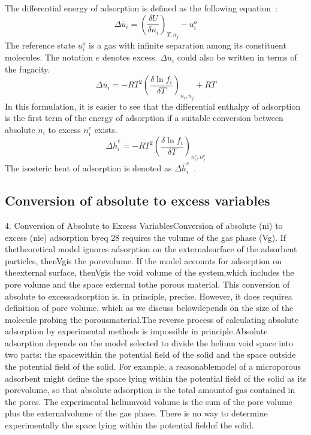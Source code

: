 \documentclass[letterpaper,twocolumn,amsmath,amssymb,jcp,aps,10pt]{revtex4-1}
\begin{document}
The differential energy of adsorption is defined as the following equation~\cite{myers2002adsorption}:
\begin{equation}
    \Delta \bar u_i = \left( \frac{\delta U}{\delta n_i} \right)_{T,n_j} - u_i^o
\end{equation}
The reference state $u_i^o$ is a gas with infinite separation among its constituent molecules. The notation $e$ denotes excess. $\Delta \bar u_i$ could
also be written in terms of the fugacity.
\begin{equation}
    \Delta \bar u_i = -R T^2\left( \frac{\delta \ln f_i}{\delta T} \right)_{n_i,n_j} + RT
\end{equation}
In this formulation, it is easier to see that the differential enthalpy of adsorption is the first term of the energy of adsorption if a suitable conversion between absolute $n_i$ to excess $n_i^e$ exists.
\begin{equation}
    \Delta \bar h_i^e = -R T^2\left( \frac{\delta \ln f_i}{\delta T} \right)_{n_i^e,n_j^e}
\end{equation}
The isosteric heat of adsorption is denoted as $\Delta \bar h_i^e$~\cite{myers2002adsorption}.

\subsection{Conversion of absolute to excess variables}
4. Conversion of Absolute to Excess VariablesConversion of absolute (ni) to excess (nie) adsorption byeq 28 requires the volume of the gas phase (Vg). If thetheoretical  model  ignores  adsorption  on  the  externalsurface of the adsorbent particles, thenVgis the porevolume.  If  the  model  accounts  for  adsorption  on  theexternal surface, thenVgis the void volume of the system,which includes the pore volume and the space external tothe porous material. This conversion of absolute to excessadsorption is, in principle, precise. However, it does requirea definition of pore volume, which as we discuss belowdepends on the size of the molecule probing the porousmaterial.The reverse process of calculating absolute adsorption by  experimental  methods  is  impossible  in  principle.Absolute  adsorption  depends  on  the  model  selected  to divide the helium void space into two parts:  the spacewithin the potential field of the solid and the space outside the potential field of the solid. For example, a reasonablemodel of a microporous adsorbent might define the space lying within the potential field of the solid as its porevolume, so that absolute adsorption is the total amountof gas contained in the pores. The experimental heliumvoid volume is the sum of the pore volume plus the externalvolume of the gas phase. There is no way to determine experimentally the space lying within the potential fieldof the solid.
\end{document}
